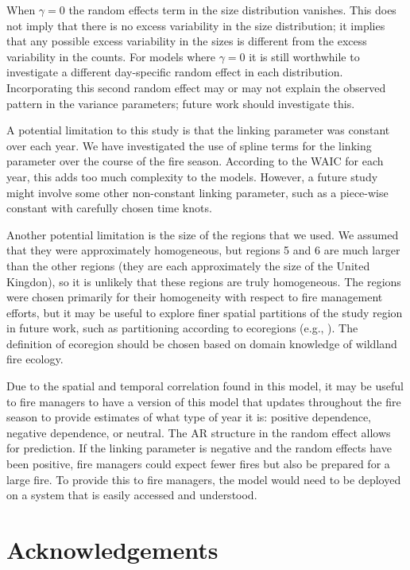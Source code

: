 \documentclass[10pt,letterpaper]{article}
\begin{document}
When $\gamma = 0$ the random effects term in the size distribution vanishes. This does not imply that there is no excess variability in the size distribution; it implies that any possible excess variability in the sizes is different from the excess variability in the counts. For models where $\gamma = 0$ it is still worthwhile to investigate a different day-specific random effect in each distribution. Incorporating this second random effect may or may not explain the observed pattern in the variance parameters; future work should investigate this.

A potential limitation to this study is that the linking parameter was
constant over each year. We have investigated the use of spline terms
for the linking parameter over the course of the fire season. According
to the WAIC for each year, this adds too much complexity to the models.
However, a future study might involve some other non-constant linking
parameter, such as a piece-wise constant with carefully chosen time knots.

Another potential limitation is the size of the regions that we used. We
assumed that they were approximately homogeneous, but regions 5 and 6
are much larger than the other regions (they are each approximately the size of the United Kingdon), so it is unlikely
that these regions are truly homogeneous. The regions were chosen
primarily for their homogeneity with respect to fire management efforts,
but it may be useful to explore finer spatial partitions of the study region in future work, such as partitioning according to ecoregions (e.g., \cite{ecologicalstratificationworkinggroupcanadaNationalEcologicalFramework1996}). The definition of ecoregion should be chosen based on domain
knowledge of wildland fire ecology.

Due to the spatial and temporal correlation found in this model, it may
be useful to fire managers to have a version of this model that updates
throughout the fire season to provide estimates of what type of year it
is: positive dependence, negative dependence, or neutral. The AR
structure in the random effect allows for prediction. If the linking
parameter is negative and the random effects have been positive, fire
managers could expect fewer fires but also be prepared for a large fire.
To provide this to fire managers, the model would need to be deployed on
a system that is easily accessed and understood.

\hypertarget{acknowledgements}{%
\section{Acknowledgements}\label{acknowledgements}}
\end{document}
